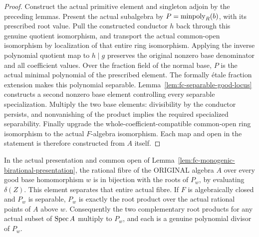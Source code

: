 \begin{proof}
Construct the actual primitive element and singleton adjoin by the preceding lemmas. Present the actual
subalgebra by $P=\operatorname{minpoly}_R(b)$, with its prescribed root value. Pull the constructed conductor $h$ back
through this genuine quotient isomorphism, and transport the actual common-open isomorphism by localization
of that entire ring isomorphism. Applying the inverse polynomial quotient map to $h\mid g$ preserves the
original nonzero base denominator and all coefficient values.
Over the fraction field of the normal base, $P$ is the actual minimal polynomial of the prescribed element.
The formally \'etale fraction extension makes this polynomial separable. Lemma~\ref{lem:fc-separable-good-locus}
constructs a second nonzero base element controlling every separable specialization. Multiply the two
base elements: divisibility by the conductor persists, and nonvanishing of the product implies the required
specialized separability. Finally upgrade the whole-coefficient-compatible common-open ring isomorphism to
the actual $F$-algebra isomorphism. Each map and open in the statement is therefore constructed from $A$ itself.
\end{proof}

\begin{lemma}\label{lem:fc-original-fibre-factors}
\leanok
{}
In the actual presentation and common open of Lemma~\ref{lem:fc-monogenic-birational-presentation}, the rational
fibre of the ORIGINAL algebra $A$ over every good base homomorphism $w$ is in bijection with the roots of $P_w$,
by evaluating $\delta(Z)$. This element separates that entire actual fibre. If $F$ is algebraically closed and
$P_w$ is separable, $P_w$ is exactly the root product over the actual rational points of $A$ above $w$.
Consequently the two complementary root products for any actual subset of $\operatorname{Spec} A$ multiply to $P_w$,
and each is a genuine polynomial divisor of $P_w$.
\end{lemma}

